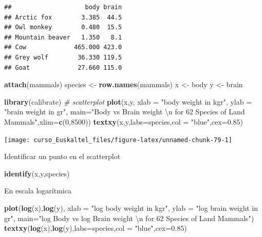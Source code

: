 \documentclass[]{book}
\newenvironment{Shaded}{\begin{snugshade}}{\end{snugshade}}
\newcommand{\KeywordTok}[1]{\textcolor[rgb]{0.13,0.29,0.53}{\textbf{#1}}}
\newcommand{\DataTypeTok}[1]{\textcolor[rgb]{0.13,0.29,0.53}{#1}}
\newcommand{\DecValTok}[1]{\textcolor[rgb]{0.00,0.00,0.81}{#1}}
\newcommand{\FloatTok}[1]{\textcolor[rgb]{0.00,0.00,0.81}{#1}}
\newcommand{\CharTok}[1]{\textcolor[rgb]{0.31,0.60,0.02}{#1}}
\newcommand{\StringTok}[1]{\textcolor[rgb]{0.31,0.60,0.02}{#1}}
\newcommand{\CommentTok}[1]{\textcolor[rgb]{0.56,0.35,0.01}{\textit{#1}}}
\newcommand{\NormalTok}[1]{#1}
\begin{document}
\begin{verbatim}
##                    body brain
## Arctic fox        3.385  44.5
## Owl monkey        0.480  15.5
## Mountain beaver   1.350   8.1
## Cow             465.000 423.0
## Grey wolf        36.330 119.5
## Goat             27.660 115.0
\end{verbatim}

\begin{Shaded}
\begin{Highlighting}[]
\KeywordTok{attach}\NormalTok{(mammals)}
\NormalTok{species <-}\StringTok{ }\KeywordTok{row.names}\NormalTok{(mammals)}
\NormalTok{x <-}\StringTok{ }\NormalTok{body}
\NormalTok{y <-}\StringTok{ }\NormalTok{brain}
\end{Highlighting}
\end{Shaded}

\begin{Shaded}
\begin{Highlighting}[]
\KeywordTok{library}\NormalTok{(calibrate)}
\CommentTok{# scatterplot}
\KeywordTok{plot}\NormalTok{(x,y, }\DataTypeTok{xlab =} \StringTok{"body weight in kgr"}\NormalTok{, }\DataTypeTok{ylab =} \StringTok{"brain weight in gr"}\NormalTok{, }
     \DataTypeTok{main=}\StringTok{"Body vs Brain weight }\CharTok{\textbackslash{}n}\StringTok{ for 62 Species of Land Mammals"}\NormalTok{,}\DataTypeTok{xlim=}\KeywordTok{c}\NormalTok{(}\DecValTok{0}\NormalTok{,}\DecValTok{8500}\NormalTok{))}
\KeywordTok{textxy}\NormalTok{(x,y,}\DataTypeTok{labs=}\NormalTok{species,}\DataTypeTok{col =} \StringTok{"blue"}\NormalTok{,}\DataTypeTok{cex=}\FloatTok{0.85}\NormalTok{) }
\end{Highlighting}
\end{Shaded}

\begin{center}\texttt{[image: curso\_Euskaltel\_files/figure-latex/unnamed-chunk-79-1]} \end{center}

Identificar un punto en el scatterplot

\begin{Shaded}
\begin{Highlighting}[]
\KeywordTok{identify}\NormalTok{(x,y,species)}
\end{Highlighting}
\end{Shaded}

En escala logarítmica

\begin{Shaded}
\begin{Highlighting}[]
\KeywordTok{plot}\NormalTok{(}\KeywordTok{log}\NormalTok{(x),}\KeywordTok{log}\NormalTok{(y), }\DataTypeTok{xlab =} \StringTok{"log body weight in kgr"}\NormalTok{, }\DataTypeTok{ylab =} \StringTok{"log brain weight in gr"}\NormalTok{, }
     \DataTypeTok{main=}\StringTok{"log Body vs log Brain weight }\CharTok{\textbackslash{}n}\StringTok{ for 62 Species of Land Mammals"}\NormalTok{)}
\KeywordTok{textxy}\NormalTok{(}\KeywordTok{log}\NormalTok{(x),}\KeywordTok{log}\NormalTok{(y),}\DataTypeTok{labs=}\NormalTok{species,}\DataTypeTok{col =} \StringTok{"blue"}\NormalTok{,}\DataTypeTok{cex=}\FloatTok{0.85}\NormalTok{) }
\end{Highlighting}
\end{Shaded}
\end{document}
